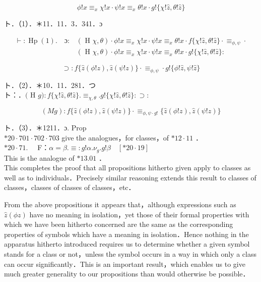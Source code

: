 \documentclass[10pt]{article}
\begin{document}
\begin{equation*}
\phi!x \equiv_{x} \chi!x \cdot \psi!x \equiv_{x} \theta!x \cdot g!\{\chi!\hat{z}, \theta!\hat{z}\} \tag{1}
\end{equation*}


ト．（1）．＊11．11．3．341．ɔ

$$
\begin{aligned}
\vdash: \operatorname{Hp}(1) . \quad ɔ: & (\text { H } \chi, \theta) \cdot \phi!x \equiv_{x} \chi!x \cdot \psi!x \equiv_{x} \theta!x \cdot f\{\chi!\hat{z}, \theta!\hat{z}\} \cdot \equiv_{\phi, \psi} \cdot \\
& (\text { H } \chi, \theta) \cdot \phi!x \equiv_{x} \chi!x \cdot \psi!x \equiv_{x} \theta!x \cdot g!\{\chi!\hat{z}, \theta!\hat{z}\}:
\end{aligned}
$$


\begin{equation*}
[* 20 \cdot 1, * 10 \cdot 35] \supset: f\{\hat{z}(\phi!z), \hat{z}(\psi!z)\} \cdot \equiv_{\phi, \psi} \cdot g!\{\phi!\hat{z}, \psi!\hat{z}\} \tag{2}
\end{equation*}


ト．（2）．＊10．11．281．つ\\
ト：．$($ H $g): f\{\chi!\hat{z}, \theta!\hat{z}\} . \equiv_{\chi, \theta} . g!\{\chi!\hat{z}, \theta!\hat{z}\}: \supset:$


\begin{equation*}
(M g): f\{\hat{z}(\phi!z), \hat{z}(\psi!z)\} \cdot \equiv_{\phi, \psi \cdot g!}\{\hat{z}(\phi!z), \hat{z}(\psi!z)\} \tag{3}
\end{equation*}


ト．（3）．＊1211．ɔ. Prop\\
$* 20 \cdot 701 \cdot 702 \cdot 703$ give the analogues，for classes，of $* 12 \cdot 11$ ．\\
$* 20 \cdot 71 . \quad$ F：$\alpha=\beta . \equiv: g!\alpha . \nu_{g} . g!\beta \quad[* 20 \cdot 19]$\\
This is the analogue of $* 13.01$ ．\\
This completes the proof that all propositions hitherto given apply to classes as well as to individuals．Precisely similar reasoning extends this result to classes of classes，classes of classes of classes，etc．

From the above propositions it appears that，although expressions such as $\hat{z}(\phi z)$ have no meaning in isolation，yet those of their formal properties with which we have been hitherto concerned are the same as the corresponding properties of symbols which have a meaning in isolation．Hence nothing in the apparatus hitherto introduced requires us to determine whether a given symbol stands for a class or not，unless the symbol occurs in a way in which only a class can occur significantly．This is an important result，which enables us to give much greater generality to our propositions than would otherwise be possible．
\end{document}
